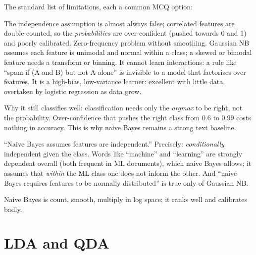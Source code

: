 The standard list of limitations, each a common MCQ option:
\begin{itemize}
	\ii The independence assumption is almost always false; correlated features are double-counted,
	so the \emph{probabilities} are over-confident (pushed towards 0 and 1) and poorly calibrated.
	\ii Zero-frequency problem without smoothing.
	\ii Gaussian NB assumes each feature is unimodal and normal within a class; a skewed or
	bimodal feature needs a transform or binning.
	\ii It cannot learn interactions: a rule like ``spam if (A and B) but not A alone'' is invisible to
	a model that factorises over features.
	\ii It is a high-bias, low-variance learner: excellent with little data, overtaken by logistic
	regression as data grow.
\end{itemize}

Why it still classifies well: classification needs only the \emph{argmax} to be right, not the
probability. Over-confidence that pushes the right class from $0.6$ to $0.99$ costs nothing in
accuracy. This is why naive Bayes remains a strong text baseline.

\begin{remark}
	\trap ``Naive Bayes assumes features are independent.'' Precisely: \emph{conditionally}
	independent given the class. Words like ``machine'' and ``learning'' are strongly dependent
	overall (both frequent in ML documents), which naive Bayes allows; it assumes that \emph{within}
	the ML class one does not inform the other. And ``naive Bayes requires features to be
	normally distributed'' is true only of Gaussian NB.
\end{remark}

\begin{moral}
	Naive Bayes is count, smooth, multiply in log space; it ranks well and calibrates badly.
\end{moral}

\section{LDA and QDA}

